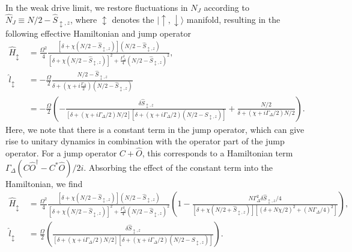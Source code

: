 In the weak drive limit, we restore fluctuations in $N_J$ according to $\hat{N}_J \equiv N/2 - \hat{S}_{\updownarrow,z}$, where $\updownarrow$ denotes the $|{\uparrow},{\downarrow}\rangle$ manifold, resulting in the following effective Hamiltonian and jump operator
\begin{equation}
\begin{aligned}
    \hat H_{\updownarrow} &~= \frac{\Omega^2}{4} \frac{[\delta+\chi  (N/2-\hat{S}_{\updownarrow,z})] (N/2-\hat{S}_{\updownarrow,z})}{[\delta+\chi  (N/2-\hat{S}_{\updownarrow,z})]^2+\frac{\Gamma_\Delta^2}{4} (N/2-\hat{S}_{\updownarrow,z})^2}, \\
    \hat l_{\updownarrow} &~= -\frac{\Omega}{2}\frac{N/2-\hat{S}_{\updownarrow,z}}{\delta +(\chi + i \frac{\Gamma_\Delta}{2}) (N/2-\hat{S}_{\updownarrow,z})}
    \\ &~ = -\frac{\Omega}{2} \left( -\frac{\delta \hat{S}_{\updownarrow,z}}{[\delta + (\chi + i \Gamma_\Delta/2) N/2][ \delta + (\chi + i \Gamma_\Delta/2) (N/2 - S_{\updownarrow,z})]}  + \frac{N/2}{\delta + (\chi + i \Gamma_\Delta/2)N/2}\right).
\end{aligned}
\end{equation}
Here, we note that there is a constant term in the jump operator, which can give rise to unitary dynamics in combination with the operator part of the jump operator. For a jump operator $C + \hat O$, this corresponds to a Hamiltonian term $\Gamma_\Delta (C \hat O^\dagger - C^* \hat O)/2i$. Absorbing the effect of the constant term into the Hamiltonian, we find
\begin{subequations}
\begin{align}
    \hat H_{\updownarrow} &~ = \frac{\Omega^2}{4} \frac{[\delta+\chi  (N/2-\hat{S}_{\updownarrow,z})] (N/2-\hat{S}_{\updownarrow,z})}{[\delta+\chi  (N/2-\hat{S}_{\updownarrow,z})]^2+\frac{\Gamma_\Delta^2}{4} (N/2-\hat{S}_{\updownarrow,z})^2}\left(1 - \frac{N \Gamma_\Delta^2 \delta \hat S_{\updownarrow,z} /4 }{[\delta+ \chi (N/2+\hat S_{\updownarrow,z})] [ (\delta +N \chi/2)^2 + (N \Gamma_\Delta/4)^2] }\right),\\
    \hat l_{\updownarrow} &~ = \frac{\Omega}{2} \left( \frac{\delta \hat{S}_{\updownarrow,z}}{[\delta + (\chi + i \Gamma_\Delta/2) N/2][ \delta + (\chi + i \Gamma_\Delta/2) (N/2 - S_{\updownarrow,z})]}\right).
\end{align}
\end{subequations}

